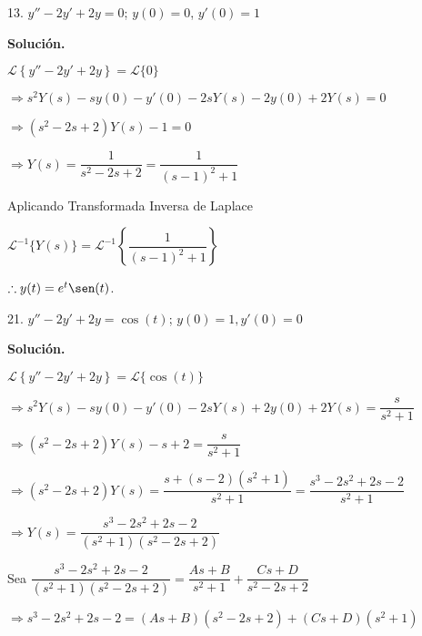 \documentclass[fleqn]{article}
\begin{document}
    13. $ y'' - 2y' + 2y = 0 $; $ y(0) = 0 $, $ y'(0) = 1 $

    \textbf{Solución.}

    $ \mathscr{L} \left\lbrace y'' - 2y' + 2y \right\rbrace = \mathscr{L} \lbrace 0 \rbrace $

    $ \Longrightarrow s^2 Y(s) - s y(0) - y'(0) - 2s Y(s) - 2y(0) + 2Y(s) = 0 $

    $ \Longrightarrow (s^2 - 2s + 2)Y(s) - 1 = 0 $

    $ \Longrightarrow Y(s) = \dfrac{1}{s^2 - 2s + 2} = \dfrac{1}{(s - 1)^2 + 1} $

    Aplicando Transformada Inversa de Laplace

    $ \mathscr{L}^{-1} \lbrace Y(s) \rbrace = \mathscr{L}^{-1} \left\lbrace \dfrac{1}{(s - 1)^2 + 1} \right\rbrace $

    $ \therefore y(t) = e^t \sen (t) $.


    21. $ y'' - 2y' + 2y = \cos (t) $; $ y(0) = 1, y'(0) = 0 $

    \textbf{Solución.}

    $ \mathscr{L} \left\lbrace y'' - 2y' + 2y \right\rbrace = \mathscr{L} \lbrace \cos (t) \rbrace $

    $ \Longrightarrow s^2 Y(s) - s y(0) - y'(0) - 2s Y(s) + 2y(0) + 2Y(s) = \dfrac{s}{s^2 + 1} $

    $ \Longrightarrow (s^2 - 2s + 2)Y(s) - s + 2 = \dfrac{s}{s^2 + 1} $

    $ \Longrightarrow (s^2 - 2s + 2)Y(s) = \dfrac{s + (s - 2)(s^2 + 1)}{s^2 + 1} = \dfrac{s^3 - 2s^2 + 2s - 2}{s^2 + 1} $

    $ \Longrightarrow Y(s) = \dfrac{s^3 - 2s^2 + 2s - 2}{(s^2 + 1)(s^2 - 2s + 2)} $

    Sea $ \dfrac{s^3 - 2s^2 + 2s - 2}{(s^2 + 1)(s^2 - 2s + 2)} = \dfrac{As + B}{s^2 + 1} + \dfrac{Cs + D}{s^2 - 2s + 2} $

    $ \Longrightarrow s^3 - 2s^2 + 2s - 2 = (As + B)(s^2 - 2s + 2) + (Cs + D)(s^2 + 1) $
\end{document}
